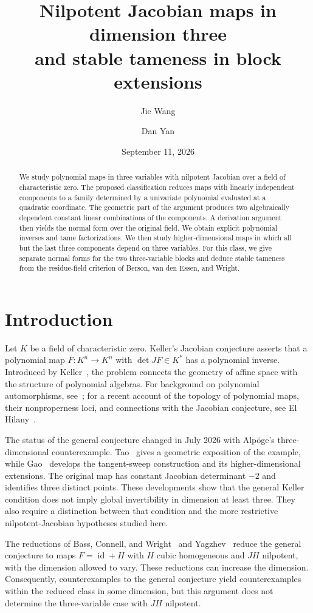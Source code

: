 \documentclass[11pt,reqno]{amsart}
\title[Nilpotent Jacobian maps and stable tameness]{Nilpotent Jacobian maps in dimension three\protect\\ and stable tameness in block extensions}
\author{Jie Wang}
\author{Dan Yan}
\date{September 11, 2026}
\theoremstyle{definition}
\theoremstyle{remark}
\numberwithin{equation}{section}
\DeclareMathOperator{\id}{id}
\begin{document}
\begin{abstract}
We study polynomial maps in three variables with nilpotent Jacobian over a field of characteristic zero. The proposed classification reduces maps with linearly independent components to a family determined by a univariate polynomial evaluated at a quadratic coordinate. The geometric part of the argument produces two algebraically dependent constant linear combinations of the components. A derivation argument then yields the normal form over the original field. We obtain explicit polynomial inverses and tame factorizations. We then study higher-dimensional maps in which all but the last three components depend on three variables. For this class, we give separate normal forms for the two three-variable blocks and deduce stable tameness from the residue-field criterion of Berson, van den Essen, and Wright.
\end{abstract}
\maketitle
\section{Introduction}\label{sec:introduction}

Let $K$ be a field of characteristic zero. Keller's Jacobian conjecture asserts that a polynomial map $F\colon K^n\to K^n$ with $\det JF\in K^*$ has a polynomial inverse. Introduced by Keller~\cite{Keller}, the problem connects the geometry of affine space with the structure of polynomial algebras. For background on polynomial automorphisms, see~\cite{EssenBook}; for a recent account of the topology of polynomial maps, their nonproperness loci, and connections with the Jacobian conjecture, see El Hilany~\cite{ElHilany2025}.

The status of the general conjecture changed in July 2026 with Alp\"oge's three-dimensional counterexample. Tao~\cite{Tao2026} gives a geometric exposition of the example, while Gao~\cite{Gao2026} develops the tangent-sweep construction and its higher-dimensional extensions. The original map has constant Jacobian determinant $-2$ and identifies three distinct points. These developments show that the general Keller condition does not imply global invertibility in dimension at least three. They also require a distinction between that condition and the more restrictive nilpotent-Jacobian hypotheses studied here.

The reductions of Bass, Connell, and Wright~\cite{BCW} and Yagzhev~\cite{Yagzhev} reduce the general conjecture to maps $F=\id+H$ with $H$ cubic homogeneous and $JH$ nilpotent, with the dimension allowed to vary. These reductions can increase the dimension. Consequently, counterexamples to the general conjecture yield counterexamples within the reduced class in some dimension, but this argument does not determine the three-variable case with $JH$ nilpotent.
\end{document}
